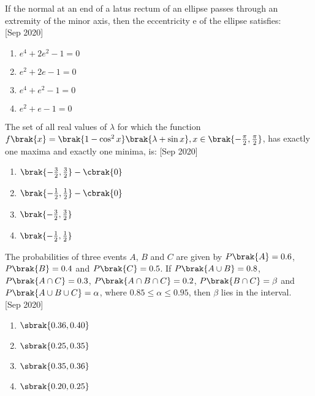 \iffalse
\title{Assignment}
\author{ee24btech11059}
\section{mcq-single}
\fi

    \item{
          	If the normal at an end of a latus rectum of an ellipse passes through an extremity of the minor axis, then the eccentricity e of the ellipse satisfies: \\ \text{  }\hfill
                {[Sep 2020]}
            \begin{multicols}{2}
				\begin{enumerate}
					\item $e^4+2e^2 - 1 = 0$
					\item $e^2+2e - 1 = 0$
					\item $e^4+e^2 - 1 = 0$
					\item $e^2+e - 1 = 0$
				\end{enumerate}
			\end{multicols}
            }
    \item{
            The set of all real values of $\lambda$ for which the function $f\brak{x} = \brak{1- \cos^2 x}\brak{\lambda+\sin x} , x\in\brak{-\frac{\pi}{2}, \frac{\pi}{2}}$, has exactly one maxima and exactly one minima, is:\hfill
                {[Sep 2020]}
            \begin{multicols}{2}
                \begin{enumerate}
                    \item $\brak{-\frac{3}{2}, \frac{3}{2}}-\cbrak{0}$
                    \item $\brak{-\frac{1}{2}, \frac{1}{2}}-\cbrak{0}$
                    \item $\brak{-\frac{3}{2}, \frac{3}{2}}$
                    \item $\brak{-\frac{1}{2}, \frac{1}{2}}$
                \end{enumerate}
            \end{multicols}
        }
\item{
        	
        	The probabilities of three events $A$, $B$ and $C$ are given by $P\brak{A} = 0.6$, $P\brak{B} = 0.4$ and $P\brak{C} = 0.5$. If $P\brak{A \cup B} = 0.8$, $P\brak{A \cap C} = 0.3$, $P\brak{A \cap B \cap C} = 0.2$, $P\brak{B \cap C} = \beta$ and $P\brak{A \cup B \cup C} = \alpha$, where $0.85 \leq \alpha \leq 0.95$, then $\beta$ lies in the interval. \\
        	\hfill
        	{[Sep 2020]}
        	\begin{multicols}{4}
        		\begin{enumerate}
        			\item $\sbrak{0.36,0.40}$
        			\item $\sbrak{0.25,0.35}$
        			\item $\sbrak{0.35,0.36}$
        			\item $\sbrak{0.20,0.25}$
        		\end{enumerate}
        	\end{multicols}
        	
        }
